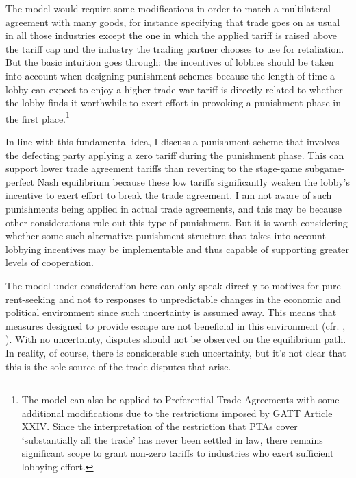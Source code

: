 \documentclass[authoryear, review]{elsarticle}
\begin{document}
The model would require some modifications in order to match a multilateral agreement with many goods, for instance specifying that trade goes on as usual in all those industries except the one in which the applied tariff is raised above the tariff cap and the industry the trading partner chooses to use for retaliation. But the basic intuition goes through: the incentives of lobbies should be taken into account when designing punishment schemes because the length of time a lobby can expect to enjoy a higher trade-war tariff is directly related to whether the lobby finds it worthwhile to exert effort in provoking a punishment phase in the first place.\footnote{The model can also be applied to Preferential Trade Agreements with some additional modifications due to the restrictions imposed by GATT Article XXIV. Since the interpretation of the restriction that PTAs cover `substantially all the trade' has never been settled in law, there remains significant scope to grant non-zero tariffs to industries who exert sufficient lobbying effort.}

In line with this fundamental idea, I discuss a punishment scheme that involves the defecting party applying a zero tariff during the punishment phase. This can support lower trade agreement tariffs than reverting to the stage-game subgame-perfect Nash equilibrium because these low tariffs significantly weaken the lobby's incentive to exert effort to break the trade agreement. I am not aware of such punishments being applied in actual trade agreements, and this may be because other considerations rule out this type of punishment. But it is worth considering whether some such alternative punishment structure that takes into account lobbying incentives may be implementable and thus capable of supporting greater levels of cooperation.

The model under consideration here can only speak directly to motives for pure rent-seeking and not to responses to unpredictable changes in the economic and political environment since such uncertainty is assumed away. This means that measures designed to provide escape are not beneficial in this environment (cfr. \citet{bs2005}, \citet{buzard2014}). With no uncertainty, disputes should not be observed on the equilibrium path. In reality, of course, there is considerable such uncertainty, but it's not clear that this is the sole source of the trade disputes that arise.
\end{document}
